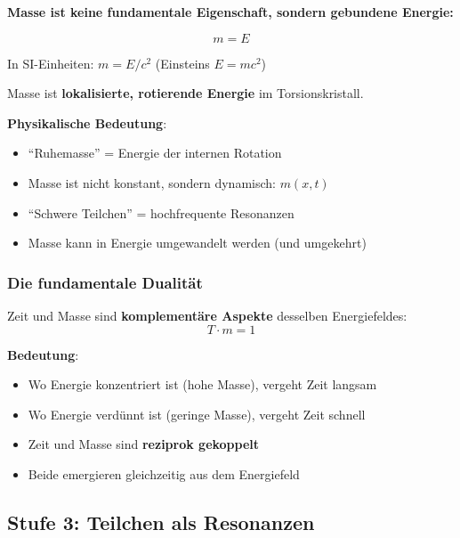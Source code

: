 	\begin{keyresult}
		\textbf{Masse ist keine fundamentale Eigenschaft, sondern gebundene Energie:}

		\begin{equation}
			\boxed{m = E}
		\end{equation}

		In SI-Einheiten: $m = E/c^2$ (Einsteins $E = mc^2$)

		\vspace{0.3cm}

		Masse ist \textbf{lokalisierte, rotierende Energie} im Torsionskristall.
	\end{keyresult}

	\textbf{Physikalische Bedeutung}:
	\begin{itemize}
		\item \enquote{Ruhemasse} = Energie der internen Rotation
		\item Masse ist nicht konstant, sondern dynamisch: $m(x,t)$
		\item \enquote{Schwere Teilchen} = hochfrequente Resonanzen
		\item Masse kann in Energie umgewandelt werden (und umgekehrt)
	\end{itemize}

	\subsubsection{Die fundamentale Dualität}

	Zeit und Masse sind \textbf{komplementäre Aspekte} desselben Energiefeldes:
	\begin{equation}
		\boxed{T \cdot m = 1}
	\end{equation}

	\textbf{Bedeutung}:
	\begin{itemize}
		\item Wo Energie konzentriert ist (hohe Masse), vergeht Zeit langsam
		\item Wo Energie verdünnt ist (geringe Masse), vergeht Zeit schnell
		\item Zeit und Masse sind \textbf{reziprok gekoppelt}
		\item Beide emergieren gleichzeitig aus dem Energiefeld
	\end{itemize}

	\subsection{Stufe 3: Teilchen als Resonanzen}

